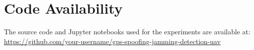 
\section*{Code Availability}

The source code and Jupyter notebooks used for the experiments are
available at: \url{https://github.com/your-username/gps-spoofing-jamming-detection-uav}
